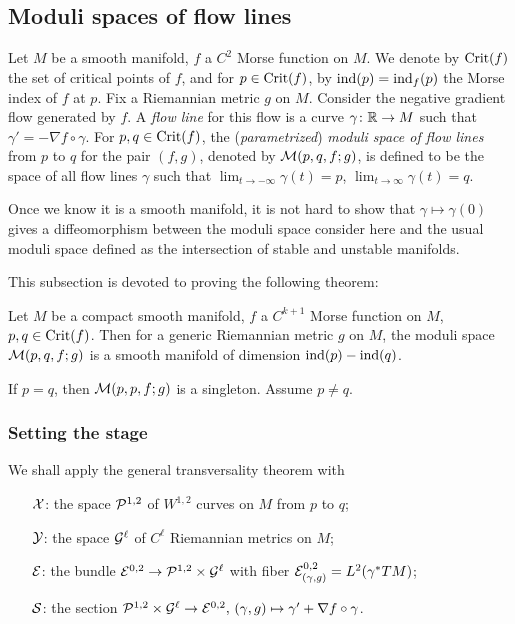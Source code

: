 \subsection{Moduli spaces of flow lines}
Let $M$ be a smooth manifold, $f$ a $C^2$ Morse function on $M$. 
We denote by $\operatorname{Crit}(f)$ the set of critical points of $f$, and 
for $p \in \operatorname{Crit}(f)$, by $\operatorname{ind}(p) = \operatorname{ind}_f (p)$ the Morse index of $f$ at $p$. 
Fix a Riemannian metric $g$ on $M$. 
Consider the negative gradient flow generated by $f$. 
A \textit{flow line} for this flow is a curve $\gamma \colon {\mathbb{R}} \to M$ 
such that $\gamma' = - \nabla f \circ \gamma$. 
For $p, q \in \operatorname{Crit}(f)$, the (\textit{parametrized}) 
\textit{moduli space of flow lines} from $p$ to $q$ for the pair $(f, g)$, 
denoted by ${\mathcal{M}}(p, q, f; g)$, is defined to be the space of all flow lines 
$\gamma$ such that $\lim_{t \to -\infty} \gamma(t) = p$, 
$\lim_{t \to \infty} \gamma(t) = q$.

\begin{remark}
	Once we know it is a smooth manifold, it is not hard to show that 
	$\gamma \mapsto \gamma(0)$ gives a diffeomorphism 
	between the moduli space consider here and the usual moduli space 
	defined as the intersection of stable and unstable manifolds.
\end{remark}

\medskip

\noindent This subsection is devoted to proving the following theorem:

\begin{theorem}
	Let $M$ be a compact smooth manifold, 
	$f$ a $C^{k + 1}$ Morse function on $M$, $p, q \in \operatorname{Crit}(f)$. 
	Then for a generic Riemannian metric $g$ on $M$, the moduli space 
	${\mathcal{M}}(p, q, f; g)$ is a smooth manifold of dimension $\operatorname{ind}(p) - \operatorname{ind}(q)$.
\end{theorem}

If $p = q$, then ${\mathcal{M}}(p, p, f; g)$ is a singleton. Assume $p\neq q$.

\subsubsection{Setting the stage}
We shall apply the general transversality theorem with

\begin{itemize}
	\item[${\mathcal{X}}$:] 
		the space ${\mathcal{P}}^{1, 2}$ of $W^{1, 2}$ curves on $M$ from $p$ to $q$;
	\item[${\mathcal{Y}}$:] 
		the space ${\mathcal{G}}^\ell$ of $C^\ell$ Riemannian metrics on $M$;
	\item[${\mathcal{E}}$:] 
		the bundle ${\mathcal{E}}^{0, 2} \to {\mathcal{P}}^{1, 2} \times {\mathcal{G}}^\ell$ 
		with fiber ${\mathcal{E}}^{0, 2}_{(\gamma, g)} = L^2(\gamma^*TM)$;
	\item[${\mathcal{S}}$:] 
		the section ${\mathcal{P}}^{1, 2} \times {\mathcal{G}}^\ell \to {\mathcal{E}}^{0,2},\, 
		(\gamma, g) \mapsto \gamma' + \nabla f \circ \gamma$.
\end{itemize}

